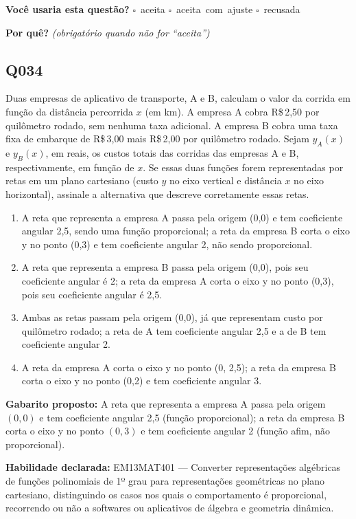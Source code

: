 \documentclass[11pt,a4paper]{article}
\begin{document}
\textbf{Você usaria esta questão?}\quad
\mbox{$\square$~aceita} \quad \mbox{$\square$~aceita com ajuste} \quad
\mbox{$\square$~recusada}

\textbf{Por quê?} \emph{(obrigatório quando não for ``aceita'')}

\underline{\hspace{\linewidth}}

\underline{\hspace{\linewidth}}
\vspace{0.6em}

\begin{samepage}
\subsection*{Q034}
Duas empresas de aplicativo de transporte, A e B, calculam o valor da corrida em função da distância percorrida $x$ (em km). A empresa A cobra R\$\,2,50 por quilômetro rodado, sem nenhuma taxa adicional. A empresa B cobra uma taxa fixa de embarque de R\$\,3,00 mais R\$\,2,00 por quilômetro rodado. Sejam $y_A(x)$ e $y_B(x)$, em reais, os custos totais das corridas das empresas A e B, respectivamente, em função de $x$. Se essas duas funções forem representadas por retas em um plano cartesiano (custo $y$ no eixo vertical e distância $x$ no eixo horizontal), assinale a alternativa que descreve corretamente essas retas.
\begin{enumerate}[label=(\alph*),nosep,leftmargin=*]
\item A reta que representa a empresa A passa pela origem (0,0) e tem coeficiente angular 2,5, sendo uma função proporcional; a reta da empresa B corta o eixo y no ponto (0,3) e tem coeficiente angular 2, não sendo proporcional.
\item A reta que representa a empresa B passa pela origem (0,0), pois seu coeficiente angular é 2; a reta da empresa A corta o eixo y no ponto (0,3), pois seu coeficiente angular é 2,5.
\item Ambas as retas passam pela origem (0,0), já que representam custo por quilômetro rodado; a reta de A tem coeficiente angular 2,5 e a de B tem coeficiente angular 2.
\item A reta da empresa A corta o eixo y no ponto (0, 2,5); a reta da empresa B corta o eixo y no ponto (0,2) e tem coeficiente angular 3.
\end{enumerate}

\textbf{Gabarito proposto:} A reta que representa a empresa A passa pela origem $(0,0)$ e tem coeficiente angular 2,5 (função proporcional); a reta da empresa B corta o eixo y no ponto $(0,3)$ e tem coeficiente angular 2 (função afim, não proporcional).

\textbf{Habilidade declarada:} EM13MAT401 --- Converter representações algébricas de funções polinomiais de 1º grau para representações geométricas no plano cartesiano, distinguindo os casos nos quais o comportamento é proporcional, recorrendo ou não a softwares ou aplicativos de álgebra e geometria dinâmica.
\end{samepage}
\end{document}
